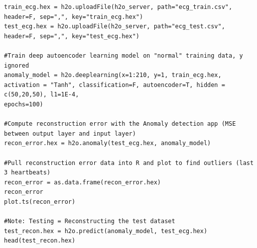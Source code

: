 \begin{lstlisting}[style=R]
train_ecg.hex = h2o.uploadFile(h2o_server, path="ecg_train.csv", header=F, sep=",", key="train_ecg.hex") 
test_ecg.hex = h2o.uploadFile(h2o_server, path="ecg_test.csv", header=F, sep=",", key="test_ecg.hex") 

#Train deep autoencoder learning model on "normal" training data, y ignored 
anomaly_model = h2o.deeplearning(x=1:210, y=1, train_ecg.hex, activation = "Tanh", classification=F, autoencoder=T, hidden = c(50,20,50), l1=1E-4, 
epochs=100)                 
                              
#Compute reconstruction error with the Anomaly detection app (MSE between output layer and input layer)
recon_error.hex = h2o.anomaly(test_ecg.hex, anomaly_model)
                              
#Pull reconstruction error data into R and plot to find outliers (last 3 heartbeats)
recon_error = as.data.frame(recon_error.hex)
recon_error
plot.ts(recon_error)

#Note: Testing = Reconstructing the test dataset
test_recon.hex = h2o.predict(anomaly_model, test_ecg.hex) 
head(test_recon.hex)              

\end{lstlisting}
\noindent

\newpage

